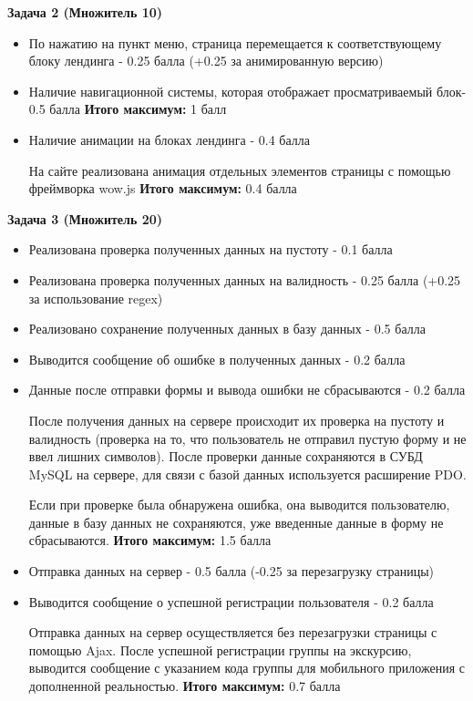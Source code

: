 \textbf{Задача 2 (Множитель 10)}
\begin{itemize}
    \item По нажатию на пункт меню, страница перемещается к соответствующему блоку лендинга  - 0.25 балла (+0.25 за анимированную версию)
    \item Наличие навигационной системы, которая отображает просматриваемый блок- 0.5 балла
    \textbf{Итого максимум:} 1 балл

    \item Наличие анимации на блоках лендинга - 0.4 балла

    На сайте реализована анимация отдельных элементов страницы с помощью фреймворка wow.js
    \textbf{Итого максимум:} 0.4 балла
\end{itemize}

\textbf{Задача 3 (Множитель 20)}

\begin{itemize}
    \item Реализована проверка полученных данных на пустоту - 0.1 балла
    \item Реализована проверка полученных данных на валидность - 0.25 балла (+0.25 за использование regex)
    \item Реализовано сохранение полученных данных в базу данных - 0.5 балла
    \item Выводится сообщение об ошибке в полученных данных - 0.2 балла
    \item Данные после отправки формы и вывода ошибки не сбрасываются - 0.2 балла
    
    После получения данных на сервере происходит их проверка на пустоту и валидность (проверка на то, что пользователь не отправил пустую форму и не ввел лишних символов). После проверки данные сохраняются в СУБД MySQL на сервере, для связи с базой данных используется расширение PDO. 

    Если при проверке была обнаружена ошибка, она выводится пользователю, данные в базу данных не сохраняются, уже введенные данные в форму не сбрасываются.
    \textbf{Итого максимум:} 1.5 балла
    
    \item Отправка данных на сервер - 0.5 балла (-0.25 за перезагрузку страницы)
    \item Выводится сообщение о успешной регистрации пользователя - 0.2 балла
    
    Отправка данных на сервер осуществляется без перезагрузки страницы с помощью Ajax. После успешной регистрации группы на экскурсию, выводится сообщение с указанием кода группы для мобильного приложения с дополненной реальностью.
    \textbf{Итого максимум:} 0.7 балла
\end{itemize}

